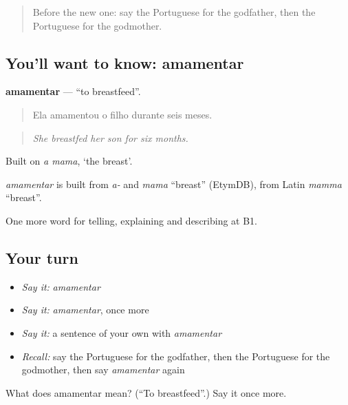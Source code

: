 \label{lesson:PT-C310-amamentar}



\begin{quote}
Before the new one: say the Portuguese for the godfather, then the Portuguese for the godmother.
\end{quote}

\subsection*{You'll want to know: amamentar}
\textbf{amamentar} — \textquotedblleft{}to breastfeed\textquotedblright{}.

\begin{quote}
Ela amamentou o filho durante seis meses.
\end{quote}

\begin{quote}
\emph{She breastfed her son for six months.}
\end{quote}

Built on \emph{a mama}, ‘the breast’.

\begin{cousinweb}
\emph{amamentar} is built from \emph{a-} and \emph{mama} \textquotedblleft{}breast\textquotedblright{} (EtymDB), from Latin \emph{mamma} \textquotedblleft{}breast\textquotedblright{}.
\end{cousinweb}

\begin{grammarlens}[title={What you've built}]
One more word for telling, explaining and describing at B1.
\end{grammarlens}

\subsection*{Your turn}
\begin{itemize}
\raggedright
  \item \emph{Say it:} \emph{amamentar}
  \item \emph{Say it:} \emph{amamentar}, once more
  \item \emph{Say it:} a sentence of your own with \emph{amamentar}
  \item \emph{Recall:} say the Portuguese for the godfather, then the Portuguese for the godmother, then say \emph{amamentar} again
\end{itemize}

\begin{tcolorbox}[breakable,colback=teal!4,colframe=teal!35!black,title={Before you move on}]
What does amamentar mean? (\textquotedblleft{}To breastfeed\textquotedblright{}.) Say it once more.
\end{tcolorbox}
